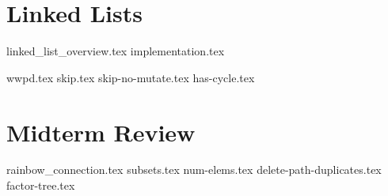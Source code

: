 \documentclass{exam}
\begin{document}
\section{Linked Lists}
{linked_list_overview.tex}
{implementation.tex}
\newpage
\begin{questions}
{wwpd.tex}
\newpage
{skip.tex}
{skip-no-mutate.tex}
{has-cycle.tex}
\end{questions}

\newpage
\section{Midterm Review}
\begin{questions}
{rainbow_connection.tex}
{subsets.tex}
\newpage
{num-elems.tex}
\newpage
{delete-path-duplicates.tex}
{factor-tree.tex}
\end{questions}
\end{document}
